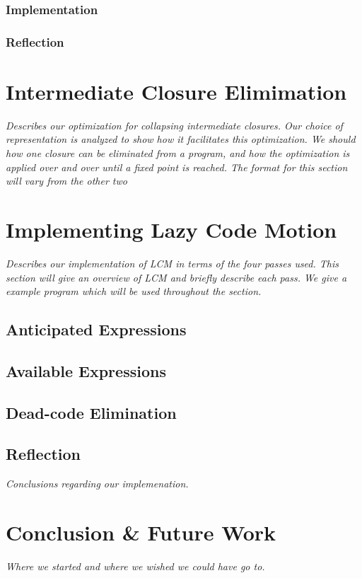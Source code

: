 \documentclass[11pt]{article}
\begin{document}
\subsubsection{Implementation}
\subsubsection{Reflection}

\section{Intermediate Closure Elimimation}
\emph{Describes our optimization for collapsing intermediate
closures. Our choice of representation is analyzed to
show how it facilitates this optimization. We should how one
closure can be eliminated from a program, and how the optimization
is applied over and over until a fixed point is reached. The format
for this section will vary from the other two}

\section{Implementing Lazy Code Motion}
\emph{Describes our implementation of LCM in terms of the four passes
  used. This section will give an overview of LCM and briefly describe
  each pass. We give a example program which will be used throughout
  the section.}

\subsection{Anticipated Expressions}

\subsection{Available Expressions}

\subsection{Dead-code Elimination}

\subsection{Reflection}

\emph{Conclusions regarding our implemenation.}

\section{Conclusion \& Future Work}

\emph{Where we started and where we wished we could have go to.}
\end{document}
